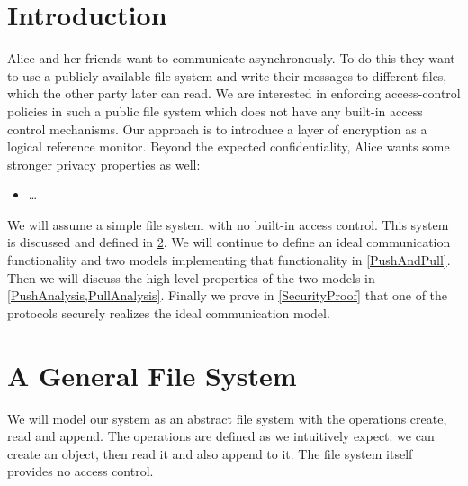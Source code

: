 \acresetall{}
\section{Introduction}\label{Introduction}

Alice and her friends want to communicate asynchronously.
To do this they want to use a publicly available file system and write their 
messages to different files, which the other party later can read.
We are interested in enforcing access-control policies in such a public file 
system which does not have any built-in access control mechanisms.
Our approach is to introduce a layer of encryption as a logical reference 
monitor.
Beyond the expected confidentiality, Alice wants some stronger privacy 
properties as well:
\begin{itemize}
  \item \dots
\end{itemize}

We will assume a simple file system with no built-in access control.
This system is discussed and defined in \cref{FileSystem}.
We will continue to define an ideal communication functionality and two models 
implementing that functionality in \cref{PushAndPull}.
Then we will discuss the high-level properties of the two models in 
\cref{PushAnalysis,PullAnalysis}.
Finally we prove in \cref{SecurityProof} that one of the protocols securely 
realizes the ideal communication model.



\section{A General File System}\label{FileSystem}

We will model our system as an abstract file system with the operations create, 
read and append.
The operations are defined as we intuitively expect: we can create an object, 
then read it and also append to it.
The file system itself provides no access control.


